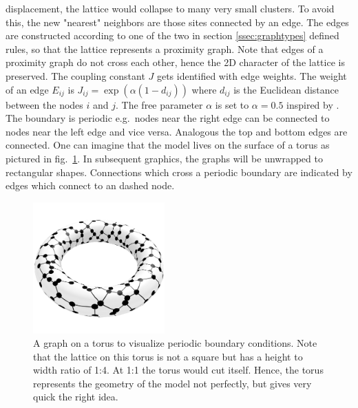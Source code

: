     displacement, the lattice would collapse to many very small clusters.
    To avoid this, the new "nearest" neighbors are those sites connected
    by an edge. The edges are constructed according to
    one of the two in section \ref{ssec:graphtypes} defined rules,
    so that the lattice represents a proximity graph. Note that edges
    of a proximity graph do not cross each other, hence the 2D character
    of the lattice is preserved. The coupling constant \(J\) gets
    identified with edge weights. The weight of an edge \(E_{ij}\) is
    \(J_{ij} = \exp (\alpha (1-d_{ij}))\) where \(d_{ij}\) is the Euclidean
    distance between the nodes \(i\) and \(j\). The free parameter
    \(\alpha\) is set to \(\alpha = 0.5\) inspired by \cite{Lima2000}.
    The boundary is periodic e.g.\ nodes near the right edge can be
    connected to nodes near the left edge and vice versa. Analogous the
    top and bottom edges are connected. One can imagine that the model
    lives on the surface of a torus as pictured in fig.\ \ref{fig:torusRNG}.
    In subsequent graphics, the graphs will be unwrapped to rectangular
    shapes. Connections which cross a periodic boundary are indicated
    by edges which connect to an dashed node.
    \begin{figure}[htbp]
        \centering
        \includegraphics[width=0.45\textwidth]{images/torus}
        \caption[A Graph on a Torus to Visualise Periodic Boundary Conditions]
        {
            A graph on a torus to visualize periodic boundary conditions.
            Note that the lattice on this torus is not a square but has
            a height to width ratio of 1:4. At 1:1 the torus would cut
            itself. Hence, the torus represents the geometry of the model
            not perfectly, but gives very quick the right idea.
        }
        \label{fig:torusRNG}
    \end{figure}\\
